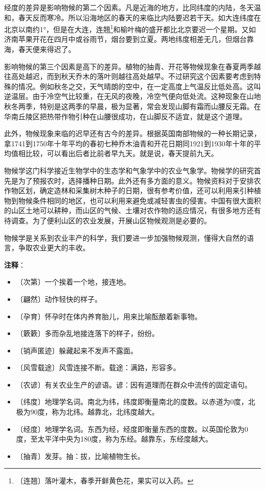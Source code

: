 \documentclass[12pt,UTF-8,openany]{ctexbook}
\begin{document}
\begin{large}
    经度的差异是影响物候的第二个因素。凡是近海的地方，比同纬度的内陆，冬天温和，春天反而寒冷。所以沿海地区的春天的来临比内陆要迟若干天。如大连纬度在北京以南约1°，但是在大连，连翘\footnote{〔连翘〕落叶灌木，春季开鲜黄色花，果实可以入药。}和榆叶梅的盛开都比北京要迟一个星期。又如济南苹果开花在四月中或谷雨节，烟台要到立夏。两地纬度相差无几，但烟台靠海，春天便来得迟了。
    
    影响物候的第三个因素是高下的差异。植物的抽青、开花等物候现象在春夏两季越往高处越迟，而到秋天乔木的落叶则越往高处越早。不过研究这个因素要考虑到特殊的情况。例如秋冬之交，天气晴朗的空中，在一定高度上气温反比低处高。这叫逆温层。由于冷空气比较重，在无风的夜晚，冷空气便向低处流。这种现象在山地秋冬两季，特别是这两季的早晨，极为显著，常会发现山脚有霜而山腰反无霜。在华南丘陵区把热带作物引种在山腰很成功，在山脚反不适宜，就是这个道理。
    
    此外，物候现象来临的迟早还有古今的差异。根据英国南部物候的一种长期记录，拿1741到1750年十年平均的春初七种乔木油青和开花日期同1921到1930年十年的平均值相比较，可以看出后者比前者早九天。就是说，春天提前九天。
    
    物候学这门科学接近生物学中的生态学和气象学中的农业气象学。物候学的研究首先是为了预报农时，选择播种日期。此外还有多方面的意义。物候资料对于安排农作物区划，确定造林和采集树木种子的日期，很有参考价值，还可以利用来引种植物到物候条件相同的地区，也可以利用来避免或减轻害虫的侵害。中国有很大面积的山区土地可以耕种，而山区的气候、土壤对农作物的适应情况，有很多地方还有待调查。为了便利山区的农业发展，开展山区物候观测是必要的。
    
    物候学是关系到农业丰产的科学，我们要进一步加强物候观测，懂得大自然的语言，争取农业更大的丰收。
    
\end{large}


\newpage

\textbf{注释}：

\vspace{-1em}

\begin{itemize}
    \setlength\itemsep{-0.2em}
    \item 〔次第〕一个挨着一个地，接连地。
    \item 〔翩然〕动作轻快的样子。
    \item 〔孕育〕怀孕时在体内养育胎儿，用来比喻酝酿着新事物。
    \item 〔簌簌〕多而杂乱地接连落下的样子，纷纷。
    \item 〔销声匿迹〕躲藏起来不发声不露面。
    \item 〔风雪载途〕风雪连接不断。载途：满路，形容多。
    \item 〔农谚〕有关农业生产的谚语。谚：因有道理而在群众中流传的固定语句。
    \item 〔纬度〕地理学名词。南北为纬，纬度即衡量南北的度数。以赤道为0度，北极为90度，称为北纬。越靠北，北纬度越大。
    \item 〔经度〕地理学名词。东西为经，经度即衡量东西的度数。以英国伦敦为0度，至太平洋中央为180度，称为东经。越靠东，东经度越大。
    \item 〔抽青〕发芽。抽：拔，比喻植物生长。
\end{itemize}
\end{document}
